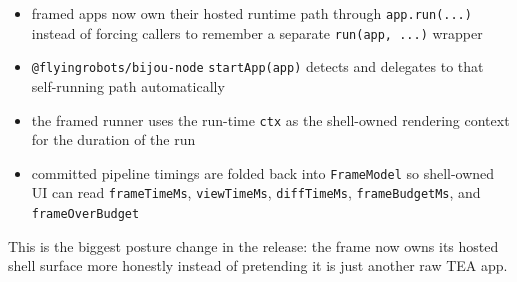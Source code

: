 \begin{itemize}
\tightlist
\item
  framed apps now own their hosted runtime path through \texttt{a\allowbreak{}p\allowbreak{}p\allowbreak{}.\allowbreak{}r\allowbreak{}u\allowbreak{}n\allowbreak{}(\allowbreak{}.\allowbreak{}.\allowbreak{}.\allowbreak{})} instead of forcing callers to remember a separate \texttt{r\allowbreak{}u\allowbreak{}n\allowbreak{}(\allowbreak{}a\allowbreak{}p\allowbreak{}p\allowbreak{},\allowbreak{} \allowbreak{}.\allowbreak{}.\allowbreak{}.\allowbreak{})} wrapper
\item
  \texttt{@\allowbreak{}f\allowbreak{}l\allowbreak{}y\allowbreak{}i\allowbreak{}n\allowbreak{}g\allowbreak{}r\allowbreak{}o\allowbreak{}b\allowbreak{}o\allowbreak{}t\allowbreak{}s\allowbreak{}/\allowbreak{}b\allowbreak{}i\allowbreak{}j\allowbreak{}o\allowbreak{}u\allowbreak{}-\allowbreak{}n\allowbreak{}o\allowbreak{}d\allowbreak{}e} \texttt{s\allowbreak{}t\allowbreak{}a\allowbreak{}r\allowbreak{}t\allowbreak{}A\allowbreak{}p\allowbreak{}p\allowbreak{}(\allowbreak{}a\allowbreak{}p\allowbreak{}p\allowbreak{})} detects and delegates to that self-running path automatically
\item
  the framed runner uses the run-time \texttt{c\allowbreak{}t\allowbreak{}x} as the shell-owned rendering context for the duration of the run
\item
  committed pipeline timings are folded back into \texttt{F\allowbreak{}r\allowbreak{}a\allowbreak{}m\allowbreak{}e\allowbreak{}M\allowbreak{}o\allowbreak{}d\allowbreak{}e\allowbreak{}l} so shell-owned UI can read \texttt{f\allowbreak{}r\allowbreak{}a\allowbreak{}m\allowbreak{}e\allowbreak{}T\allowbreak{}i\allowbreak{}m\allowbreak{}e\allowbreak{}M\allowbreak{}s}, \texttt{v\allowbreak{}i\allowbreak{}e\allowbreak{}w\allowbreak{}T\allowbreak{}i\allowbreak{}m\allowbreak{}e\allowbreak{}M\allowbreak{}s}, \texttt{d\allowbreak{}i\allowbreak{}f\allowbreak{}f\allowbreak{}T\allowbreak{}i\allowbreak{}m\allowbreak{}e\allowbreak{}M\allowbreak{}s}, \texttt{f\allowbreak{}r\allowbreak{}a\allowbreak{}m\allowbreak{}e\allowbreak{}B\allowbreak{}u\allowbreak{}d\allowbreak{}g\allowbreak{}e\allowbreak{}t\allowbreak{}M\allowbreak{}s}, and \texttt{f\allowbreak{}r\allowbreak{}a\allowbreak{}m\allowbreak{}e\allowbreak{}O\allowbreak{}v\allowbreak{}e\allowbreak{}r\allowbreak{}B\allowbreak{}u\allowbreak{}d\allowbreak{}g\allowbreak{}e\allowbreak{}t}
\end{itemize}

This is the biggest posture change in the release: the frame now owns its hosted shell surface more honestly instead of pretending it is just another raw TEA app.

